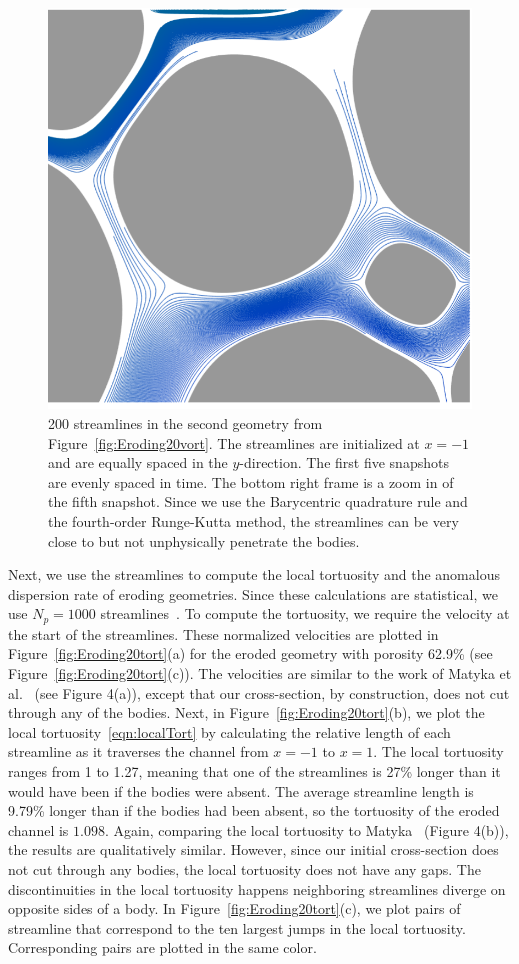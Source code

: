 \documentclass[preprint, 10pt]{elsarticle}
\begin{document}
\begin{figure}[H]
\begin{center}
\includegraphics[width = 0.32 \textwidth]{./figs/tracer_20b270_zoom}
\caption{\label{fig:Eroding20tracer} 200 streamlines in the second
geometry from Figure~\ref{fig:Eroding20vort}. The streamlines are
initialized at $x=-1$ and are equally spaced in the $y$-direction. The
first five snapshots are evenly spaced in time.  The bottom right frame
is a zoom in of the fifth snapshot.  Since we use the Barycentric
quadrature rule and the fourth-order Runge-Kutta method, the streamlines
can be very close to but not unphysically penetrate the bodies.}
\end{center}
\end{figure}

Next, we use the streamlines to compute the local tortuosity and the
anomalous dispersion rate of eroding geometries.  Since these
calculations are statistical, we use $N_p = 1000$
streamlines~\cite{bel-sal-rin1992}.  To compute the tortuosity, we
require the velocity at the start of the streamlines.  These normalized
velocities are plotted in Figure~\ref{fig:Eroding20tort}(a) for the
eroded geometry with porosity 62.9\% (see
Figure~\ref{fig:Eroding20tort}(c)).  The velocities are similar to the
work of Matyka et al.~\cite{mat-kha-koz2008} (see Figure 4(a)), except
that our cross-section, by construction, does not cut through any of the
bodies.  Next, in Figure~\ref{fig:Eroding20tort}(b), we plot the local
tortuosity~\eqref{eqn:localTort} by calculating the relative length of
each streamline as it traverses the channel from $x=-1$ to $x=1$.  The
local tortuosity ranges from 1 to 1.27, meaning that one of the
streamlines is 27\% longer than it would have been if the bodies were
absent.  The average streamline length is 9.79\% longer than if the
bodies had been absent, so the tortuosity of the eroded channel is
$1.098$.  Again, comparing the local tortuosity to
Matyka~\cite{mat-kha-koz2008} (Figure 4(b)), the results are
qualitatively similar. However, since our initial cross-section does not
cut through any bodies, the local tortuosity does not have any gaps.
The discontinuities in the local tortuosity happens neighboring
streamlines diverge on opposite sides of a body.  In
Figure~\ref{fig:Eroding20tort}(c), we plot pairs of streamline that
correspond to the ten largest jumps in the local tortuosity.
Corresponding pairs are plotted in the same color.
\end{document}
